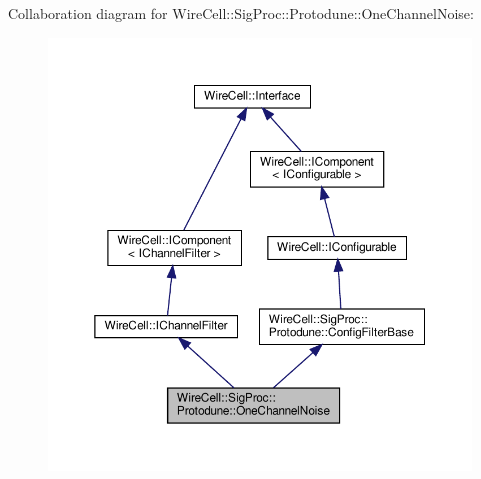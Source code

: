 Collaboration diagram for Wire\+Cell\+:\+:Sig\+Proc\+:\+:Protodune\+:\+:One\+Channel\+Noise\+:
\nopagebreak
\begin{figure}[H]
\begin{center}
\leavevmode
\includegraphics[width=350pt]{class_wire_cell_1_1_sig_proc_1_1_protodune_1_1_one_channel_noise__coll__graph}
\end{center}
\end{figure}
